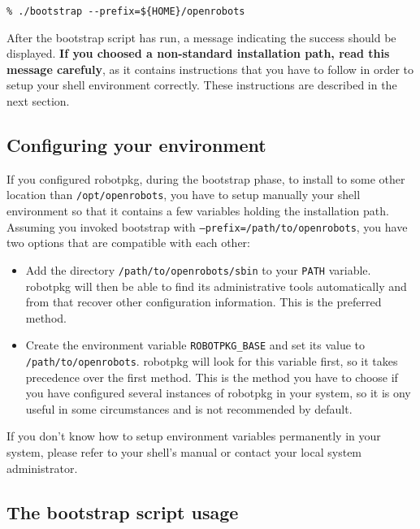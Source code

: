 \begin{verbatim}
% ./bootstrap --prefix=${HOME}/openrobots
\end{verbatim}

After the bootstrap script has run, a message  indicating the success should be
displayed.   {\bf If you choosed  a  non-standard installation path, read  this
message carefuly}, as it contains instructions that you have to follow in order
to setup your shell environment correctly.  These instructions are described in
the next section.


\subsection{Configuring your environment} %

If  you configured robotpkg,   during the bootstrap  phase,  to install to some
other location   than {\tt /opt/openrobots}, you  have   to setup manually your
shell environment so that it contains a few  variables holding the installation
path.  Assuming  you invoked bootstrap with {\tt --prefix=/path/to/openrobots},
you have two options that are compatible with each other:

\begin{itemize}
   \item Add  the directory {\tt  /path/to/openrobots/sbin}  to your {\tt PATH}
   variable. robotpkg will    then be able  to find    its administrative tools
   automatically and from that recover other configuration information. This is
   the preferred method.

   \item Create the environment variable {\tt ROBOTPKG\_BASE} and set its value
   to {\tt  /path/to/openrobots}.  robotpkg will  look for this variable first,
   so it takes precedence over the  first method.  This  is the method you have
   to  choose if you  have  configured several  instances of  robotpkg in  your
   system, so it is ony useful in some circumstances  and is not recommended by
   default.
\end{itemize}

If  you  don't know  how  to setup   environment variables  permanently in your
system,  please  refer  to  your shell's  manual  or contact  your local system
administrator.


\subsection{The bootstrap script usage} %

